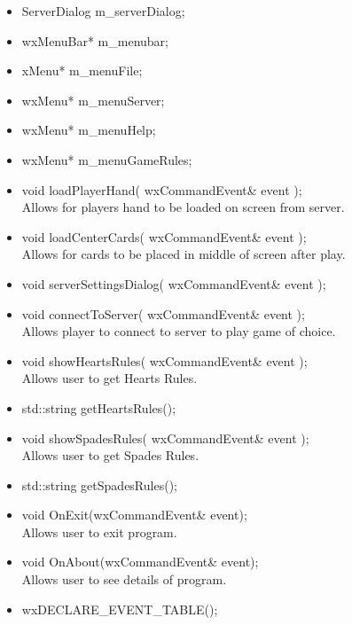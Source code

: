 \documentclass[]{scrartcl}
\begin{document}
\begin{itemize}
		\begin{itemize}
			\item ServerDialog m\_serverDialog;
			\item wxMenuBar* m\_menubar;
			\item xMenu* m\_menuFile;
			\item wxMenu* m\_menuServer;
			\item wxMenu* m\_menuHelp;
			\item wxMenu* m\_menuGameRules;
			\item void loadPlayerHand( wxCommandEvent\& event );
				\\Allows for players hand to be loaded on screen from server.
			\item void loadCenterCards( wxCommandEvent\& event );
				\\Allows for cards to be placed in middle of screen after play.
			\item void serverSettingsDialog( wxCommandEvent\& event );
			\item void connectToServer( wxCommandEvent\& event );
				\\Allows player to connect to server to play game of choice.
			\item void showHeartsRules( wxCommandEvent\& event );
				\\Allows user to get Hearts Rules.
			\item std::string getHeartsRules();
			\item void showSpadesRules( wxCommandEvent\& event );
				\\Allows user to get Spades Rules.
			\item std::string getSpadesRules();
			\item void OnExit(wxCommandEvent\& event);
				\\Allows user to exit program.
			\item void OnAbout(wxCommandEvent\& event);
				\\Allows user to see details of program.
			\item wxDECLARE\_EVENT\_TABLE();
		\end{itemize}
	\end{itemize}
\end{document}
